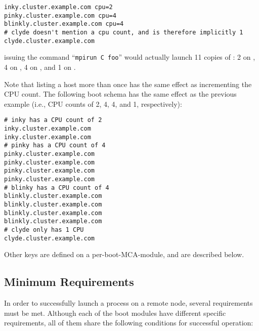\lstset{style=lam-shell}
\begin{lstlisting}
inky.cluster.example.com cpu=2
pinky.cluster.example.com cpu=4
blinkly.cluster.example.com cpu=4
# clyde doesn't mention a cpu count, and is therefore implicitly 1
clyde.cluster.example.com
\end{lstlisting}

\noindent issuing the command ``{\tt mpirun C foo}'' would actually
launch 11 copies of : 2 on , 4 on , 4
on , and 1 on .

Note that listing a host more than once has the same effect as
incrementing the CPU count.  The following boot schema has the same
effect as the previous example (i.e., CPU counts of 2, 4, 4, and 1,
respectively):

\lstset{style=lam-shell}
\begin{lstlisting}
# inky has a CPU count of 2
inky.cluster.example.com
inky.cluster.example.com
# pinky has a CPU count of 4
pinky.cluster.example.com
pinky.cluster.example.com
pinky.cluster.example.com
pinky.cluster.example.com
# blinky has a CPU count of 4
blinkly.cluster.example.com 
blinkly.cluster.example.com 
blinkly.cluster.example.com 
blinkly.cluster.example.com 
# clyde only has 1 CPU
clyde.cluster.example.com
\end{lstlisting}

Other keys are defined on a per-boot-MCA-module, and are described
below.


\subsection{Minimum Requirements}
\label{sec:mca-orte-pls-min-reqs}

In order to successfully launch a process on a remote node, several
requirements must be met.  Although each of the boot modules have
different specific requirements, all of them share the following
conditions for successful operation:

